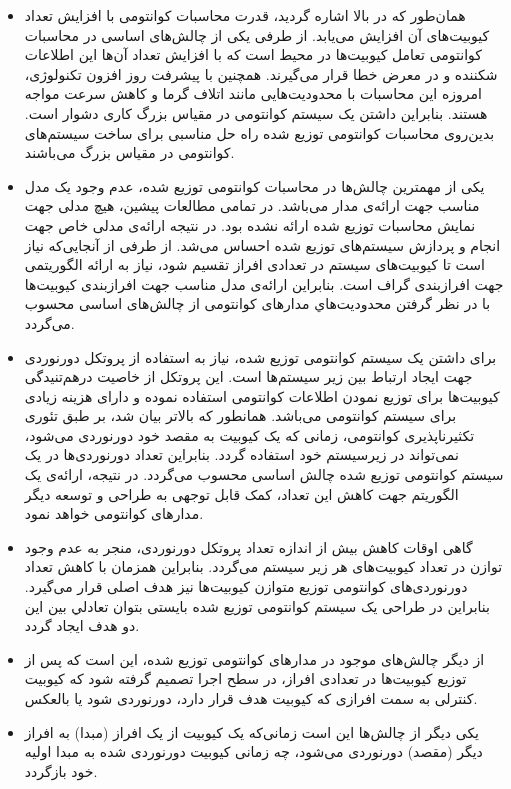 \begin{itemize}
\item
همان‌طور که در بالا اشاره گردید، قدرت محاسبات کوانتومی با افزایش تعداد کیوبیت‌های آن افزایش می‌یابد. از طرفی یکی از چالش‌های اساسی در محاسبات کوانتومی تعامل کیوبیت‌ها در محیط است که با افزایش تعداد آن‌ها این اطلاعات شکننده و در معرض خطا قرار می‌گیرند. همچنین با پیشرفت روز افزون تکنولوژی، امروزه این محاسبات با محدودیت‌هایی مانند اتلاف گرما و کاهش سرعت مواجه هستند. بنابراين داشتن یک سیستم کوانتومی در مقیاس بزرگ کاری دشوار است. بدین‌روی محاسبات کوانتومی توزیع شده راه حل مناسبی برای ساخت سیستم‌های کوانتومی در مقیاس بزرگ می‌باشند.
\item
یکی از مهمترین چالش‌ها در محاسبات کوانتومی توزیع شده، عدم وجود یک مدل مناسب جهت ارائه‌ی مدار می‌باشد. در تمامی مطالعات پیشین، هیچ مدلی جهت نمایش محاسبات توزیع شده ارائه نشده بود. در نتیجه ارائه‌ی مدلی خاص جهت انجام و پردازش‌ سیستم‌های توزیع شده احساس می‌شد. از طرفی از آنجایی‌که نیاز است تا کیوبیت‌های سیستم در تعدادی افراز تقسیم شود، نیاز به ارائه الگوریتمی جهت افرازبندی گراف است. بنابراین ارائه‌ی مدل مناسب جهت افرازبندی کیوبیت‌ها با در نظر گرفتن محدودیت‌هاي مدارهای کوانتومی از چالش‌های اساسی محسوب می‌گردد.
 \item
برای داشتن یک سیستم کوانتومی توزیع شده، نیاز به استفاده از پروتکل دورنوردی جهت ایجاد ارتباط بین زیر سیستم‌ها است. این پروتکل از خاصیت درهم‌تنیدگی کیوبیت‌ها برای توزیع نمودن اطلاعات کوانتومی استفاده نموده و دارای هزینه زیادی برای سیستم کوانتومی می‌باشد. همانطور که بالاتر بیان شد، بر طبق تئوری تکثیرناپذیری کوانتومی، زمانی که یک کیوبیت به مقصد خود دورنوردی می‌شود، نمی‌تواند در زیرسیستم خود استفاده گردد. بنابراین تعداد دورنوردی‌ها در یک سیستم کوانتومی توزیع شده چالش اساسی محسوب می‌گردد. در نتیجه، ارائه‌ی یک الگوریتم جهت کاهش این تعداد، کمک قابل توجهی به طراحی و توسعه دیگر مدارهای کوانتومی خواهد نمود.

\item
گاهی اوقات کاهش بیش از اندازه تعداد پروتکل دورنوردی، منجر به عدم وجود توازن در تعداد کیوبیت‌های هر زیر سیستم می‌گردد. بنابراین همزمان با کاهش تعداد دورنوردی‌های کوانتومی توزیع متوازن کیوبیت‌ها نیز هدف اصلی قرار می‌گیرد. بنابراین در طراحی یک سیستم کوانتومی توزیع شده بایستی بتوان تعادلي بين اين دو هدف ايجاد گردد.

\item
از دیگر چالش‌های موجود در مدارهای کوانتومی توزیع شده، این است که پس از توزیع کیوبیت‌ها در تعدادی افراز، در سطح اجرا تصمیم گرفته شود که کیوبیت کنترلی به سمت افرازی که کیوبیت هدف قرار دارد، دورنوردی شود یا بالعکس. 

\item
یکی دیگر از چالش‌ها این است زمانی‌که یک کیوبیت از یک افراز (مبدا) به افراز دیگر (مقصد) دورنوردی می‌شود، چه زمانی کیوبیت دورنوردی شده به مبدا اولیه خود بازگردد. 
\end{itemize}


